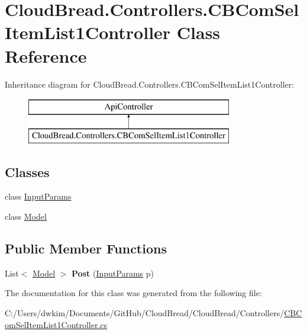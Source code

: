 \hypertarget{a00028}{}\section{Cloud\+Bread.\+Controllers.\+C\+B\+Com\+Sel\+Item\+List1\+Controller Class Reference}
\label{a00028}
Inheritance diagram for Cloud\+Bread.\+Controllers.\+C\+B\+Com\+Sel\+Item\+List1\+Controller\+:\begin{figure}[H]
\begin{center}
\leavevmode
\includegraphics[height=2.000000cm]{a00028}
\end{center}
\end{figure}
\subsection*{Classes}
\begin{DoxyCompactItemize}
\item 
class \hyperlink{a00122}{Input\+Params}
\item 
class \hyperlink{a00149}{Model}
\end{DoxyCompactItemize}
\subsection*{Public Member Functions}
\begin{DoxyCompactItemize}
\item 
List$<$ \hyperlink{a00149}{Model} $>$ {\bfseries Post} (\hyperlink{a00122}{Input\+Params} p)\hypertarget{a00028_af380b95d0be1eecc1e870c9980be4e94}{}\label{a00028_af380b95d0be1eecc1e870c9980be4e94}

\end{DoxyCompactItemize}


The documentation for this class was generated from the following file\+:\begin{DoxyCompactItemize}
\item 
C\+:/\+Users/dwkim/\+Documents/\+Git\+Hub/\+Cloud\+Bread/\+Cloud\+Bread/\+Controllers/\hyperlink{a00201}{C\+B\+Com\+Sel\+Item\+List1\+Controller.\+cs}\end{DoxyCompactItemize}
